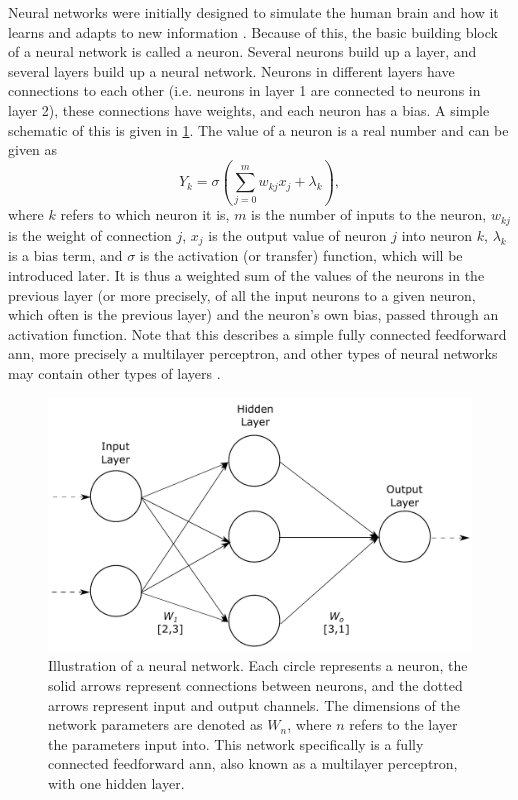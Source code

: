 Neural networks were initially designed to simulate the human brain and how it learns and adapts to new information \cite{McCulloch1943}. Because of this, the basic building block of a neural network is called a neuron. Several neurons build up a layer, and several layers build up a neural network. Neurons in different layers have connections to each other (i.e. neurons in layer 1 are connected to neurons in layer 2), these connections have weights, and each neuron has a bias. A simple schematic of this is given in \cref{fig:neuralnetwork}. The value of a neuron is a real number and can be given as \cite[81]{Wang2003}
\begin{equation}
    \label{eq:neuron}
    Y_{k} = \sigma\left(\sum_{j=0}^{m}w_{kj}x_j + \lambda_k \right),
\end{equation}
where $k$ refers to which neuron it is, $m$ is the number of inputs to the neuron, $w_{kj}$ is the weight of connection $j$, $x_j$ is the output value of neuron $j$ into neuron $k$, $\lambda_k$ is a bias term, and $\sigma$ is the activation (or transfer) function, which will be introduced later. It is thus a weighted sum of the values of the neurons in the previous layer (or more precisely, of all the input neurons to a given neuron, which often is the previous layer) and the neuron's own bias, passed through an activation function. Note that this describes a simple fully connected feedforward \gls{ann}, more precisely a multilayer perceptron, and other types of neural networks may contain other types of layers \cite{Wang2003}. 

\begin{figure}[htbp]  
    \centering
    \includegraphics[width=.8\textwidth]{figures/neuralnetwork.pdf}
    \caption[Illustration of a neural network]{Illustration of a neural network. Each circle represents a neuron, the solid arrows represent connections between neurons, and the dotted arrows represent input and output channels. The dimensions of the network parameters are denoted as $W_n$, where $n$ refers to the layer the parameters input into. This network specifically is a fully connected feedforward \gls{ann}, also known as a multilayer perceptron, with one hidden layer. }
    \label{fig:neuralnetwork}
\end{figure}

